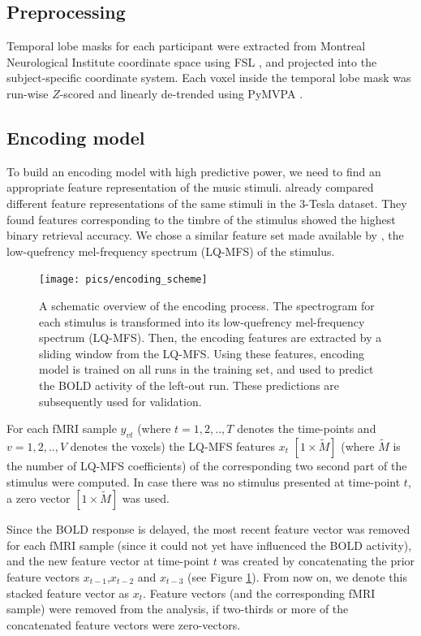 \subsection*{Preprocessing}

Temporal lobe masks for each participant were extracted from Montreal
Neurological Institute coordinate space using FSL \citep{SJB+04,JBB+12}, and
projected into the subject-specific coordinate system.
Each voxel inside the temporal lobe mask was run-wise $Z$-scored and linearly
de-trended using PyMVPA \citep{HHS09b}. 

\subsection*{Encoding model}

To build an encoding model with high predictive power, we need to find an
appropriate feature representation of the music stimuli.  \citet{CTK+2012}
already compared different feature representations of the same stimuli in the
3-Tesla dataset. They found features corresponding to the timbre of the stimulus
showed the highest binary retrieval accuracy.
We chose a similar feature set made available by \citet{HDH+2015}, the low-quefrency
mel-frequency spectrum (LQ-MFS) of the stimulus.

\begin{figure}
  \centering
  \texttt{[image: pics/encoding\_scheme]}

  \caption{A schematic overview of the encoding process. The spectrogram for
	  each stimulus is transformed into its low-quefrency mel-frequency
	  spectrum (LQ-MFS). Then, the encoding features are extracted by a
  sliding window from the LQ-MFS. Using these features, encoding model is trained on all runs in
  the training set, and used to predict the BOLD activity of the left-out run.
  These predictions are subsequently used for validation.}

 \label{fig:encoding_scheme}
\end{figure}


For each f{MRI} sample $y_{vt}$ (where $t=1,2,..,T$ denotes the time-points and
$v=1,2,..,V$ denotes the voxels) the LQ-MFS features $x_{t}$ $[1\times\widetilde{M}]$
(where $\widetilde{M}$ is the number of LQ-MFS coefficients) of the
corresponding two second part of the stimulus were computed. In case there was
no stimulus presented at time-point $t$, a zero vector $[1\times\widetilde{M}]$ was
used. 

Since the BOLD response is delayed,  the most recent feature vector was removed
for each f{MRI} sample (since it could not yet have influenced the BOLD
activity), and the new feature vector at time-point $t$ was created by
concatenating the prior feature vectors $x_{t-1}$,$x_{t-2}$ and $x_{t-3}$
(see Figure \ref{fig:encoding_scheme}). From
now on, we denote this stacked feature vector as $x_{t}$.
Feature vectors (and the corresponding f{MRI} sample) were removed from the
analysis, if two-thirds or more of the concatenated feature vectors were
zero-vectors.

